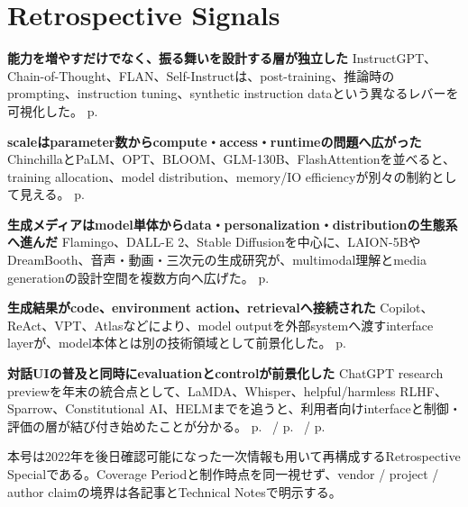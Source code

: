 \section*{Retrospective Signals}
\smallskip
\noindent\textbf{能力を増やすだけでなく、振る舞いを設計する層が独立した} InstructGPT、Chain-of-Thought、FLAN、Self-Instructは、post-training、推論時のprompting、instruction tuning、synthetic instruction dataという異なるレバーを可視化した。 \hfill{\footnotesize p.~\pageref{pkg:steering-reasoning}}\par
\smallskip
\noindent\textbf{scaleはparameter数からcompute・access・runtimeの問題へ広がった} ChinchillaとPaLM、OPT、BLOOM、GLM-130B、FlashAttentionを並べると、training allocation、model distribution、memory/IO efficiencyが別々の制約として見える。 \hfill{\footnotesize p.~\pageref{pkg:scale-access-systems}}\par
\smallskip
\noindent\textbf{生成メディアはmodel単体からdata・personalization・distributionの生態系へ進んだ} Flamingo、DALL-E 2、Stable Diffusionを中心に、LAION-5BやDreamBooth、音声・動画・三次元の生成研究が、multimodal理解とmedia generationの設計空間を複数方向へ広げた。 \hfill{\footnotesize p.~\pageref{pkg:multimodal-media}}\par
\smallskip
\noindent\textbf{生成結果がcode、environment action、retrievalへ接続された} Copilot、ReAct、VPT、Atlasなどにより、model outputを外部systemへ渡すinterface layerが、model本体とは別の技術領域として前景化した。 \hfill{\footnotesize p.~\pageref{pkg:code-action-retrieval}}\par
\smallskip
\noindent\textbf{対話UIの普及と同時にevaluationとcontrolが前景化した} ChatGPT research previewを年末の統合点として、LaMDA、Whisper、helpful/harmless RLHF、Sparrow、Constitutional AI、HELMまでを追うと、利用者向けinterfaceと制御・評価の層が結び付き始めたことが分かる。 \hfill{\footnotesize p.~\pageref{pkg:dialogue-interface-control} / p.~\pageref{pkg:evaluation-layer} / p.~\pageref{pkg:annual-synthesis}}\par
\medskip
\begin{claimboundary}
本号は2022年を後日確認可能になった一次情報も用いて再構成するRetrospective Specialである。Coverage Periodと制作時点を同一視せず、vendor / project / author claimの境界は各記事とTechnical Notesで明示する。
\end{claimboundary}
\medskip
\setcounter{tocdepth}{1}
\tableofcontents
